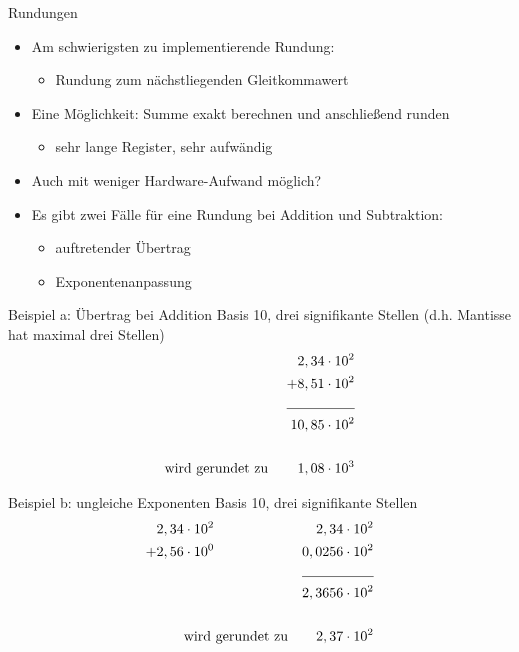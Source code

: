 \documentclass[12pt%
,xcolor=table
,aspectratio=169%
]{beamer}
\begin{document}
\begin{frame}{Rundungen}
\begin{itemize}
	\item Am schwierigsten zu implementierende Rundung:
	\begin{itemize}
		\item Rundung zum nächstliegenden Gleitkommawert
	\end{itemize}
	\item Eine Möglichkeit: Summe exakt berechnen und anschließend runden
	\begin{itemize}
		\item sehr lange Register, sehr aufwändig
	\end{itemize}
	\item Auch mit weniger Hardware-Aufwand möglich?
	\item Es gibt zwei Fälle für eine Rundung bei Addition und Subtraktion:
	\begin{itemize}
		\item auftretender Übertrag
		\item Exponentenanpassung
	\end{itemize}
\end{itemize}
\end{frame}

\begin{frame}{Beispiel a: Übertrag bei Addition}
Basis 10, drei signifikante Stellen (d.h. Mantisse hat maximal drei Stellen)
\begin{align*}
	& &2,34 	& \cdot 10^2\\
	& &+8,51	& \cdot 10^2\\ \cline{3-4}
	& &10,85 	& \cdot 10^2 \\
	& & & 	\\
	&\text{wird gerundet zu } & 1,08 	& \cdot 10^3
\end{align*}
\end{frame}

\begin{frame}{Beispiel b: ungleiche Exponenten}
Basis 10, drei signifikante Stellen
\begin{align*}
	2,34 	& \cdot 10^2 & 	2,34 	& \cdot 10^2\\
	+2,56	& \cdot 10^0 & 0,0256 	& \cdot 10^2	\\ \cline{3-4}
	& & 2,3656 & \cdot 10^2\\
	& & &\\
	&\text{wird gerundet zu} & 2,37 & \cdot 10^2
\end{align*}
\end{frame}
\end{document}
